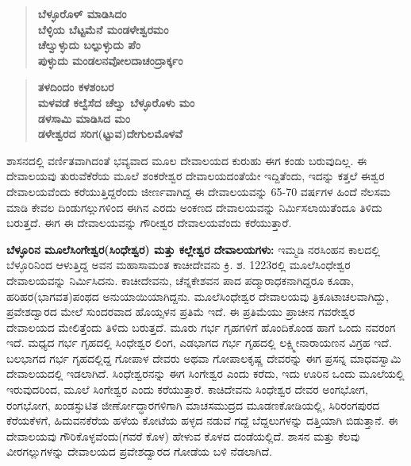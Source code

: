 \begin{verse}
\textbf{ಬೆಳ್ಳೂರೊಳ್​ ಮಾಡಿಸಿದಂ} \\\textbf{ಬೆಳ್ಳಿಯ ಬೆಟ್ಟಮೆನೆ ಮಂಡಳೇಶ್ವರಮಂ} \\\textbf{ಚೆಲ್ವುಳ್ಳುದು ಬಲ್ಪುಳ್ಳುದು ಪೆಂ} \\\textbf{ಪುಳ್ಳುದು ಮಂಡಲನವೋಲದಾಚಂದ್ರಾರ್ಕ್ಕಂ}
\end{verse}

\begin{verse}
\textbf{ತಳದಿಂದಂ ಕಳಶಂಬರ} \\\textbf{ಮಳವಡೆ ಕಲ್ವೆಸೆದ ಚೆಲ್ವು ಬೆಳ್ಳೂರೊಳು ಮಂ} \\\textbf{ಡಳಸಾಮಿ ಮಾಡಿಸಿದ ಮಂ} \\\textbf{ಡಳೇಶ್ವರದ ಸರಿಗ(ಟ್ಟುವ)ದೇಗುಲಮೊಳವೆ}
\end{verse}

ಶಾಸನದಲ್ಲಿ ವರ್ಣಿತವಾಗಿದಂತೆ ಭವ್ಯವಾದ ಮೂಲ ದೇವಾಲಯದ ಕುರುಹು ಈಗ ಕಂಡು ಬರುವುದಿಲ್ಲ. ಈ ದೇವಾಲಯವು ತುರುವೆಕೆರೆಯ ಮೂಲೆ ಶಂಕರೇಶ್ವರ ದೇವಾಲಯದಂತೆಯೇ ಇದ್ದಿತೆಂದು, ಇದನ್ನು ಕತ್ತಲೆ ಈಶ್ವರ ದೇವಾಲಯವೆಂದು ಕರೆಯುತ್ತಿದ್ದರೆಂದು ಜೀರ್ಣವಾಗಿದ್ದ ಈ ದೇವಾಲಯವನ್ನು 65-70 ವರ್ಷಗಳ ಹಿಂದೆ ನೆಲಸಮ ಮಾಡಿ ಕೇವಲ ದಿಂಡುಗಲ್ಲುಗಳಿಂದ ಈಗಿನ ಎರದು ಅಂಕಣದ ದೇವಾಲಯವನ್ನು ನಿರ್ಮಿಸಲಾಯಿತೆಂದೂ ತಿಳಿದು ಬರುತ್ತದೆ. ಈಗ ಈ ದೇವಾಲಯವನ್ನು ಗೌರೀಶ್ವರ ದೇವಾಲಯವೆಂದು ಕರೆಯುತ್ತಾರೆ.

\vskip 3pt

\textbf{ಬೆಳ್ಳೂರಿನ ಮೂಲೆಸಿಂಗೇಶ್ವರ(ಸಿಂಧೇಶ್ವರ) ಮತ್ತು ಕಲ್ಲೇಶ್ವರ ದೇವಾಲಯಗಳು:} ಇಮ್ಮಡಿ ನರಸಿಂಹನ ಕಾಲದಲ್ಲಿ ಬೆಳ್ಳೂರಿನಿಂದ ಆಳುತ್ತಿದ್ದ ಅವನ ಮಹಾಸಾಮಂತ ಕಾಚೀದೇವನು ಕ್ರಿ. ಶ. 1223ರಲ್ಲಿ ಮೂಲೆಸಿಂಧೇಶ್ವರ ದೇವಾಲಯವನ್ನು ನಿರ್ಮಿಸಿದನು. ಕಾಚೀದೇವನು, ಚೆನ್ನಕೇಶವನ ಪಾದ ಪದ್ಮಾರಾಧಕನಾಗಿದ್ದರೂ ಕೂಡಾ, ಹರಿಹರ(ಭಾಗವತ)ಪಂಥದ ಅನುಯಾಯಿಯಾಗಿದ್ದನು. ಮೂಲೆಸಿಂಧೇಶ್ವರ ದೇವಾಲಯವು ತ್ರಿಕೂಟಾಚಲವಾಗಿದ್ದು, ಪ್ರವೇಶದ್ವಾರದ ಮೇಲೆ ಸುಂದರವಾದ ಹೊಯ್ಸಳನ ಪ್ರತಿಮೆ ಇದೆ. ಈ ಪ್ರತಿಮೆಯು ಪ್ರಾಚೀನ ಗವರೇಶ್ವರ ದೇವಾಲಯದ ಮೇಲಿತ್ತೆಂದು ತಿಳಿದು ಬರುತ್ತದೆ. ಮೂರು ಗರ್ಭ ಗೃಹಗಳಿಗೆ ಹೊಂದಿಕೊಂಡ ಹಾಗೆ ಒಂದು ನವರಂಗ ಇದೆ. ಮಧ್ಯದ ಗರ್ಭ ಗೃಹದಲ್ಲಿ ಸಿಂಧೇಶ್ವರ ಲಿಂಗ, ಎಡಭಾಗದ ಗರ್ಭ ಗೃಹದಲ್ಲಿ ಲಕ್ಷ್ಮೀನಾರಾಯಣನ ವಿಗ್ರಹ ಇದೆ. ಬಲಭಾಗದ ಗರ್ಭ ಗೃಹದಲ್ಲಿದ್ದ ಗೋಪಾಳ ದೇವರು ಅಥವಾ ಗೋಪಾಲಕೃಷ್ಣ ದೇವರನ್ನು ಈಗ ಪ್ರಸನ್ನ ಮಾಧವಸ್ವಾಮಿ ದೇವಾಲಯದಲ್ಲಿ ಇಡಲಾಗಿದೆ. ಸಿಂಧೇಶ್ವರನನ್ನು ಈಗ ಸಿಂಗೇಶ್ವರ ಎಂದು ಕರೆದು, ಇದು ಊರಿನ ಒಂದು ಮೂಲೆಯಲ್ಲಿ ಇರುವುದರಿಂದ, ಮೂಲೆ ಸಿಂಗೇಶ್ವರ ಎಂದು ಕರೆಯುತ್ತಾರೆ. ಕಾಚಿದೇವನು ಸಿಂಧೇಶ್ವರ ದೇವರ ಅಂಗಭೋಗ, ರಂಗಭೋಗ, ಖಂಡಸ್ಫುಟಿತ ಜೀರ್ಣೋದ್ಧಾರಗಳಿಗಾಗಿ ಮಾಚಸಮುದ್ರದ ಮೂಡಣಕೋಡಿಯಲ್ಲಿ, ಸಿರಿರಂಗಪುರದ ಕೆರೆಯಕೆಳಗೆ, ಹಿದುವನಕೆರೆಯ ಹಳೆಯ ಕೋಟೆಯ ಹಳ್ಳದ ನಡುವೆ ಗದ್ದೆ ಬೆದ್ದಲುಗಳನ್ನು ದತ್ತಿಯಾಗಿ ಬಿಡುತ್ತಾನೆ. ಈ ದೇವಾಲಯವು ಗೌರಿಕೊಳ್ಳವೆಂದು(ಗವರೆ ಕೊಳ) ಹೇಳುವ ಕೊಳದ ದಂಡೆಯಲ್ಲಿದೆ. ಶಾಸನ ಮತ್ತು ಕೆಲವು ವೀರಗಲ್ಲುಗಳನ್ನು ದೇವಾಲಯದ ಪ್ರವೇಶದ್ವಾರದ ಗೋಡೆಯ ಬಳಿ ನೆಡಲಾಗಿದೆ.

